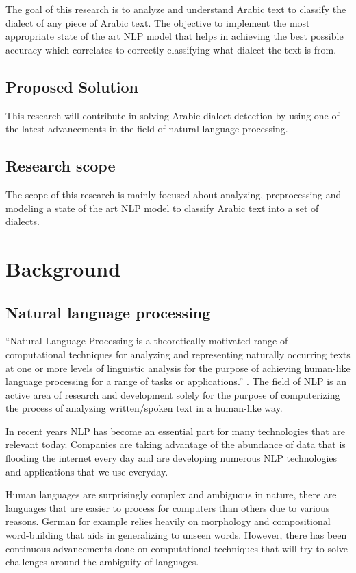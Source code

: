 \documentclass[12pt]{diazessay}
\begin{document}
    The goal of this research is to analyze and understand Arabic text to classify the dialect of any piece of Arabic text.
    The objective to implement the most appropriate state of the art NLP model that helps in achieving the best possible accuracy which correlates to correctly classifying what dialect the text is from.

    \subsection{Proposed Solution}
    This research will contribute in solving Arabic dialect detection by using one of the latest advancements in the field of natural language processing.
    
    
    \subsection{Research scope}
    The scope of this research is mainly focused about analyzing, preprocessing and modeling a state of the art NLP model to classify Arabic text into a set of dialects. 


\section{Background}


    \subsection{Natural language processing}
        “Natural Language Processing is a theoretically motivated range of computational techniques for
        analyzing and representing naturally occurring texts at one or more levels of linguistic analysis for the purpose of achieving human-like language processing for a range of tasks or applications.” \cite{natural_language_processing_book}. The field of NLP is an active area of research and development solely for the purpose of computerizing the process of analyzing written/spoken text in a human-like way.
        
        In recent years NLP has become an essential part for many technologies that are relevant today. Companies are taking advantage of the abundance of data that is flooding the internet every day and are developing numerous NLP technologies and applications that we use everyday.
        
        Human languages are surprisingly complex and ambiguous in nature, there are languages that are easier to process for computers than others due to various reasons. German for example relies heavily on morphology and compositional word-building that aids in generalizing to unseen words\cite{Felipe_Geraldo}. However, there has been continuous advancements done on computational techniques that will try to solve challenges around the ambiguity of languages.
    
\end{document}
